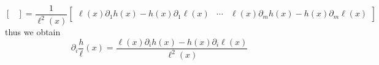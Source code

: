 \begin{theorem}
\begin{enumerate}[(a)]
{\[\begin{bmatrix}
                          \end{bmatrix}
                          =
                          \frac 1 {\ell^2(x)}
                          \begin{bmatrix}
                              \ell(x) \partial_1 h(x) - h(x) \partial_1 \ell(x)
                               & \cdots
                               & \ell(x) \partial_m h(x) - h(x) \partial_m \ell(x)
                          \end{bmatrix}
                      \]
                  }%
              thus we obtain
              \begin{equation}
                  \partial_i \frac h \ell (x) =
                  \frac{\ell(x) \partial_i h(x) - h(x) \partial_i \ell(x)}{\ell^2(x)}
              \end{equation}
    \end{enumerate}
\end{theorem}


